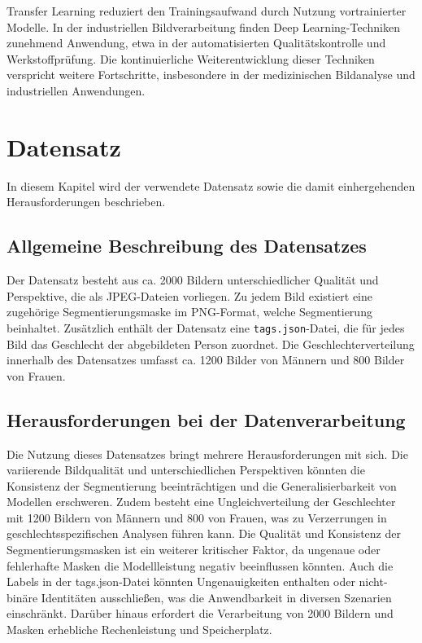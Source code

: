 \documentclass[journal,twoside,web]{ieeecolor}
\begin{document}
Transfer Learning reduziert den Trainingsaufwand durch Nutzung vortrainierter Modelle.
In der industriellen Bildverarbeitung finden Deep Learning-Techniken zunehmend Anwendung, etwa in der automatisierten Qualitätskontrolle und Werkstoffprüfung.
Die kontinuierliche Weiterentwicklung dieser Techniken verspricht weitere Fortschritte, insbesondere in der medizinischen Bildanalyse und industriellen Anwendungen.


\section{Datensatz} \label{sec:dataset}
In diesem Kapitel wird der verwendete Datensatz sowie die damit einhergehenden Herausforderungen beschrieben.

\subsection{Allgemeine Beschreibung des Datensatzes}
Der Datensatz besteht aus ca. 2000 Bildern unterschiedlicher Qualität und Perspektive, die als JPEG-Dateien vorliegen. Zu jedem Bild existiert eine zugehörige Segmentierungsmaske im PNG-Format, welche Segmentierung beinhaltet. Zusätzlich enthält der Datensatz eine \texttt{tags.json}-Datei, die für jedes Bild das Geschlecht der abgebildeten Person zuordnet. Die Geschlechterverteilung innerhalb des Datensatzes umfasst ca. 1200 Bilder von Männern und 800 Bilder von Frauen.

\subsection{Herausforderungen bei der Datenverarbeitung}  
Die Nutzung dieses Datensatzes bringt mehrere Herausforderungen mit sich. Die variierende Bildqualität und unterschiedlichen Perspektiven könnten die Konsistenz der Segmentierung beeinträchtigen und die Generalisierbarkeit von Modellen erschweren. Zudem besteht eine Ungleichverteilung der Geschlechter mit 1200 Bildern von Männern und 800 von Frauen, was zu Verzerrungen in geschlechtsspezifischen Analysen führen kann. Die Qualität und Konsistenz der Segmentierungsmasken ist ein weiterer kritischer Faktor, da ungenaue oder fehlerhafte Masken die Modellleistung negativ beeinflussen könnten. Auch die Labels in der tags.json-Datei könnten Ungenauigkeiten enthalten oder nicht-binäre Identitäten ausschließen, was die Anwendbarkeit in diversen Szenarien einschränkt. Darüber hinaus erfordert die Verarbeitung von 2000 Bildern und Masken erhebliche Rechenleistung und Speicherplatz. 
\end{document}
